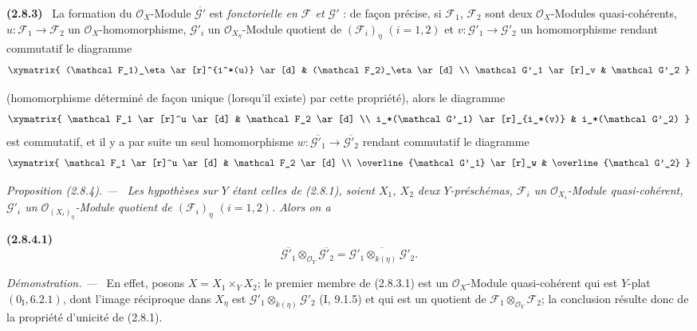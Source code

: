 \documentclass[10pt,oneside]{book}
\newcommand{\oldpage}[2][]{%
  \setcounter{footnote}{0}%
  \marginpar{\scriptsize\textbf{#1}~|~#2}\ignorespaces}
\newenvironment{env}[1][]{\par\medskip\noindent\textbf{(#1)}\ }{\par}
\newenvironment{proposition}[1][]{%
  \par\medskip\noindent\itshape Proposition (#1). ---\ }{\par}
\newenvironment{proof}{%
  \par\medskip\noindent\textit{Démonstration. ---\ }}{\par}
\begin{document}
\begin{env}[2.8.3]
\label{IV.2.8.3-fr}
La formation du $\mathcal O_X$-Module $\overline{\mathcal G'}$ est
\emph{fonctorielle en $\mathcal F$ et $\mathcal G'$} : de façon précise, si
$\mathcal F_1$, $\mathcal F_2$ sont deux $\mathcal O_X$-Modules
quasi-cohérents, $u:\mathcal F_1\to\mathcal F_2$ un
$\mathcal O_X$-homomorphisme, $\mathcal G'_i$ un
$\mathcal O_{X_\eta}$-Module quotient de $(\mathcal F_i)_\eta$ $(i=1,2)$ et
$v:\mathcal G'_1\to\mathcal G'_2$ un homomorphisme rendant commutatif le
diagramme
\[
\xymatrix{
(\mathcal F_1)_\eta \ar[r]^{i^*(u)} \ar[d] &
(\mathcal F_2)_\eta \ar[d] \\
\mathcal G'_1 \ar[r]_v & \mathcal G'_2
}
\]

\oldpage[IV-2]{35}
(homomorphisme déterminé de façon unique (lorsqu'il existe) par cette
propriété), alors le diagramme
\[
\xymatrix{
\mathcal F_1 \ar[r]^u \ar[d] & \mathcal F_2 \ar[d] \\
i_*(\mathcal G'_1) \ar[r]_{i_*(v)} & i_*(\mathcal G'_2)
}
\]
est commutatif, et il y a par suite un seul homomorphisme
$w:\overline{\mathcal G'_1}\to\overline{\mathcal G'_2}$ rendant commutatif
le diagramme
\[
\xymatrix{
\mathcal F_1 \ar[r]^u \ar[d] & \mathcal F_2 \ar[d] \\
\overline{\mathcal G'_1} \ar[r]_w & \overline{\mathcal G'_2}
}
\]
\end{env}

\begin{proposition}[2.8.4]
\label{IV.2.8.4-fr}
Les hypothèses sur $Y$ étant celles de (2.8.1), soient $X_1$, $X_2$ deux
$Y$-préschémas, $\mathcal F_i$ un $\mathcal O_{X_i}$-Module
quasi-cohérent, $\mathcal G'_i$ un $\mathcal O_{(X_i)_\eta}$-Module quotient
de $(\mathcal F_i)_\eta$ $(i=1,2)$. Alors on a
\end{proposition}

\begin{env}[2.8.4.1]
\label{IV.2.8.4.1-fr}
\[
\overline{\mathcal G'_1}\otimes_{\mathcal O_Y}\overline{\mathcal G'_2}
=\overline{\mathcal G'_1\otimes_{k(\eta)}\mathcal G'_2}.
\]
\end{env}

\begin{proof}
En effet, posons $X=X_1\times_Y X_2$; le premier membre de (2.8.3.1) est
un $\mathcal O_X$-Module quasi-cohérent qui est $Y$-plat
$(0_{\mathrm I},6.2.1)$, dont l'image réciproque dans $X_\eta$ est
$\mathcal G'_1\otimes_{k(\eta)}\mathcal G'_2$ (I, 9.1.5) et qui est un
quotient de $\mathcal F_1\otimes_{\mathcal O_Y}\mathcal F_2$; la conclusion
résulte donc de la propriété d'unicité de (2.8.1).
\end{proof}
\end{document}

